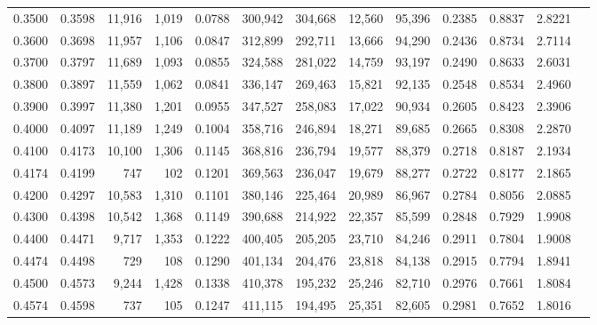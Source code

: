\begin{tabular}{rrrrrrrrrrrrr}
0.3500 & 0.3598 & 11,916 & 1,019 &                                     0.0788 & 300,942 & 304,668 &  12,560 &  95,396 & 0.2385 & 0.8837 & 2.8221 \\
0.3600 & 0.3698 & 11,957 & 1,106 &                                     0.0847 & 312,899 & 292,711 &  13,666 &  94,290 & 0.2436 & 0.8734 & 2.7114 \\
0.3700 & 0.3797 & 11,689 & 1,093 &                                     0.0855 & 324,588 & 281,022 &  14,759 &  93,197 & 0.2490 & 0.8633 & 2.6031 \\
0.3800 & 0.3897 & 11,559 & 1,062 &                                     0.0841 & 336,147 & 269,463 &  15,821 &  92,135 & 0.2548 & 0.8534 & 2.4960 \\
0.3900 & 0.3997 & 11,380 & 1,201 &                                     0.0955 & 347,527 & 258,083 &  17,022 &  90,934 & 0.2605 & 0.8423 & 2.3906 \\
0.4000 & 0.4097 & 11,189 & 1,249 &                                     0.1004 & 358,716 & 246,894 &  18,271 &  89,685 & 0.2665 & 0.8308 & 2.2870 \\
0.4100 & 0.4173 & 10,100 & 1,306 &                                     0.1145 & 368,816 & 236,794 &  19,577 &  88,379 & 0.2718 & 0.8187 & 2.1934 \\
0.4174 & 0.4199 &    747 &   102 &                                     0.1201 & 369,563 & 236,047 &  19,679 &  88,277 & 0.2722 & 0.8177 & 2.1865 \\
0.4200 & 0.4297 & 10,583 & 1,310 &                                     0.1101 & 380,146 & 225,464 &  20,989 &  86,967 & 0.2784 & 0.8056 & 2.0885 \\
0.4300 & 0.4398 & 10,542 & 1,368 &                                     0.1149 & 390,688 & 214,922 &  22,357 &  85,599 & 0.2848 & 0.7929 & 1.9908 \\
0.4400 & 0.4471 &  9,717 & 1,353 &                                     0.1222 & 400,405 & 205,205 &  23,710 &  84,246 & 0.2911 & 0.7804 & 1.9008 \\
0.4474 & 0.4498 &    729 &   108 &                                     0.1290 & 401,134 & 204,476 &  23,818 &  84,138 & 0.2915 & 0.7794 & 1.8941 \\
0.4500 & 0.4573 &  9,244 & 1,428 &                                     0.1338 & 410,378 & 195,232 &  25,246 &  82,710 & 0.2976 & 0.7661 & 1.8084 \\
0.4574 & 0.4598 &    737 &   105 &                                     0.1247 & 411,115 & 194,495 &  25,351 &  82,605 & 0.2981 & 0.7652 & 1.8016 \\

\end{tabular}
